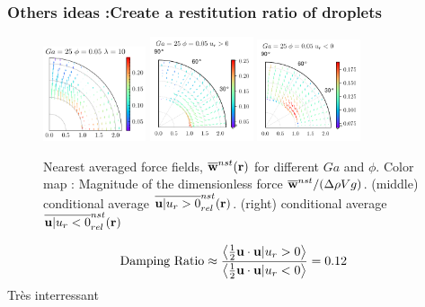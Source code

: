 \documentclass{sintefbeamer}
\begin{document}
\begin{frame}
  \frametitle{Others ideas :Create a restitution ratio of droplets}
  \begin{figure}
    \centering
    \includegraphics[width=0.27\textwidth]{image/HOMOGENEOUS/fDrop/U_mu_r_0_1_Ga_25_PHI_0_05.pdf}
    \includegraphics[width=0.27\textwidth]{image/HOMOGENEOUS/fDrop/Upos_mu_r_0_1_Ga_25_PHI_0_05.pdf}
    \includegraphics[width=0.27\textwidth]{image/HOMOGENEOUS/fDrop/Uneg_mu_r_0_1_Ga_25_PHI_0_05.pdf}
    \caption{Nearest averaged force fields, $\overline{\textbf{w}}^{nst}(\textbf{r})$ for different $Ga$ and $\phi$. 
    Color map : Magnitude of the dimensionless force  $\overline{\textbf{w}}^{nst} / (\Delta \rho V g)$.
    (middle) conditional average  $\overline{\textbf{u}| u_r > 0}^{nst}_{rel}(\textbf{r})$. 
    (right) conditional average  $\overline{\textbf{u}| u_r < 0}^{nst}_{rel}(\textbf{r})$ }
  \end{figure}
  \begin{equation}
    \text{Damping Ratio}
    \approx \frac{\left<\frac{1}{2} \textbf{u} \cdot \textbf{u}| u_r > 0\right>}
    {\left<\frac{1}{2}\textbf{u}\cdot \textbf{u}| u_r < 0\right>}
    = 0.12
  \end{equation}
Très interressant

\end{frame}
\end{document}
